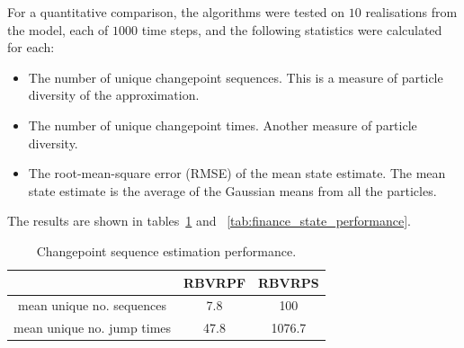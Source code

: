 \documentclass[journal]{IEEEtran}
\begin{document}
For a quantitative comparison, the algorithms were tested on $10$ realisations from the model, each of $1000$ time steps, and the following statistics were calculated for each:
\begin{itemize}
	\item The number of unique changepoint sequences. This is a measure of particle diversity of the approximation.
	\item The number of unique changepoint times. Another measure of particle diversity.
	\item The root-mean-square error (RMSE) of the mean state estimate. The mean state estimate is the average of the Gaussian means from all the particles.
\end{itemize}



The results are shown in tables~\ref{tab:finance_cp_performance} and ~\ref{tab:finance_state_performance}.%

\begin{table}%
\caption{Changepoint sequence estimation performance.}
\label{tab:finance_cp_performance}
\centering
\renewcommand{\arraystretch}{1.5}
\begin{tabular}{|c|c|c|}
\hline
 & RBVRPF & RBVRPS \\
\hline \hline
mean unique no. sequences   & 7.8      & 100       \\
\hline
mean unique no. jump times  & 47.8     & 1076.7    \\
\hline
\end{tabular}
\end{table}
\end{document}
